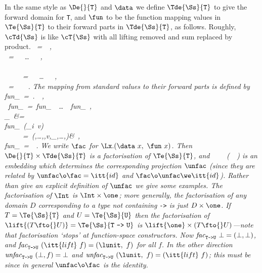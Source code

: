 In the same style as  $\De{}{\mbox{\tt T}}$ and $\data$ we define
$\Tde{\Ss}{\mbox{\tt T}}$ to give the forward domain for \mbox{\tt T}, and $\fun$ to be
the function mapping values in $\Te{\Ss}{\mbox{\tt T}}$ to their forward parts
in $\Tde{\Ss}{\mbox{\tt T}}$, as follows.  Roughly, $\cTd{\Ss}$ is like
$\cT{\Ss}$ with all lifting removed and sum replaced by product.
\beqs
\it \Tde{\Ss}{\tint}\ =\ \one\ ,\espace\\
\it \Tde{\Ss}{\tprod}\ =\ \Tde{\Ss}{\tone}\ \times\ \ldots\ \times\ \Tde{\Ss}{\tn}\ ,\espace\\
\it \Tde{\Ss}{\tsum}\\
\it \ \ \ \ \ =\ \Tde{\Ss}{\tone}\ \times\ \ldots\ \times\ \Tde{\Ss}{\tn}\ ,\espace\\
\it \Tde{\Ss}{\tfun}\ =\ \Te{\Ss}{\tone}\ \fto\ \Te{\Ss}{\ttwo}\ .
\eeqs
The mapping from standard values to their forward parts is defined by
\beqs
\it {\it{}fun}_{\subtypespace\stint}\ =\ \Lx.\unit\ ,\espace\\
\it {\it{}fun}_{\subtypespace\stprod}\ =\ {\it{}fun}_{\subtypespace\stone}\ \times\ \ldots\ \times\ {\it{}fun}_{\subtypespace\stn}\ ,\espace\\
\it {}_{\subtypespace\stsum}\ \bot&\it =\ \bot\espace\\
\it {\it{}fun}_{\subtypespace\stsum}\ (_i~v)\\
\it \ \ \ \ \ =\ (\bot,\ldots,\bot,v,\bot_,\ldots,\bot)&\it {}\ ,\ea\espace\\
\it {\it{}fun}_{\subtypespace\stfun}\ =\ \ .
\eeqs
We write $\fac$ for $\Lx.(\data~x,\ \fun~x)$.  Then
$\De{}{\mbox{\tt T}}\times\Tde{\Ss}{\mbox{\tt T}}$ is a factorisation of $\Te{\Ss}{\mbox{\tt T}}$,
and
\beqs
\it \fac\ \in\ \ \fto\ (\ \times\ )
\eeqs
is an embedding which {\it determines\/} the corresponding projection
$\unfac$ (since they are related by $\unfac\o\fac=\itt{id}$ and
$\fac\o\unfac\we\itt{id}$).  Rather than give an explicit definition of
$\unfac$ we give some examples.  The factorisation of $\Int$ is
$\Int\times\one$; more generally, the factorisation of any domain $D$
corresponding to a type not containing \mbox{\tt ->} is just $D\times\one$.  If
$T=\Te{\Ss}{\mbox{\tt T}}$ and $U=\Te{\Ss}{\mbox{\tt U}}$ then the factorisation of
$\lift{(T\fto{}U)}=\Te{\Ss}{\mbox{\tt T}\ \mbox{\tt ->}\ \mbox{\tt U}}$ is
$\lift{\one}\times(T\fto{}U)$---note that factorisation `stops' at
function-space constructors.  Now
${\it{}fac}_{\subtypespace{\makebox{\subtypesize\tt T->U}} }~\bot=(\bot,\bot)$, and
${\it{}fac}_{\subtypespace{\makebox{\subtypesize\tt T->U}} }~(\itt{lift}~f)=(\lunit,~f)$ for all $f$.  In
the other direction ${\it{}unfac}_{\subtypespace{\makebox{\subtypesize\tt T->U}} }~(\bot,f)=\bot$ and
${\it{}unfac}_{\subtypespace{\makebox{\subtypesize\tt T->U}} }~(\lunit,~f)=(\itt{lift}~f)$; this must be
since in general $\unfac\o\fac$ is the identity.

